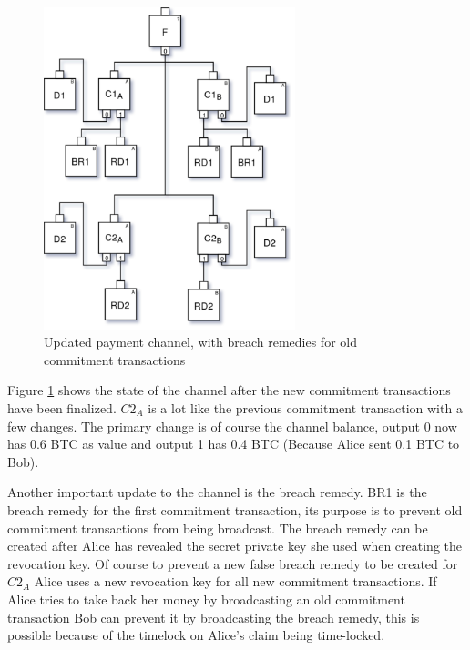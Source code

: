 \begin{figure}[H]
	\centering
	\includegraphics[width=0.65\textwidth]{background/images/payment_channel_updated.png}
	\caption{Updated payment channel, with breach remedies for old commitment transactions}
	\label{fig:pc-update}
\end{figure}

Figure \ref{fig:pc-update} shows the state of the channel after the new commitment transactions have been finalized. 
$C2_{A}$ is a lot like the previous commitment transaction with a few changes. The primary change is of course the channel balance, output 0 now has 0.6 BTC as value and output 1 has 0.4 BTC (Because Alice sent 0.1 BTC to Bob).

Another important update to the channel is the breach remedy. BR1 is the breach remedy for the first commitment transaction, its purpose is to prevent old commitment transactions from being broadcast.\cite{lightningnetwork_2019} The breach remedy can be created after Alice has revealed the secret private key she used when creating the revocation key. Of course to prevent a new false breach remedy to be created for $C2_{A}$ Alice uses a new revocation key for all new commitment transactions. If Alice tries to take back her money by broadcasting an old commitment transaction Bob can prevent it by broadcasting the breach remedy, this is possible because of the timelock on Alice's claim being time-locked.\cite{lightningnetwork_2019}

